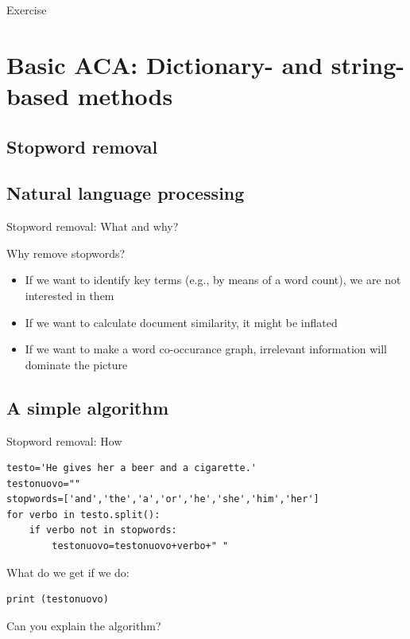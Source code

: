 \documentclass{beamer}
\begin{document}
	



\begin{frame}[plain]
Exercise
\end{frame}





\section[Basic ACA]{Basic ACA: Dictionary- and string-based methods}





\subsection[Stopword removal]{Stopword removal}

\subsection{Natural language processing}
\begin{frame}{Stopword removal: What and why?}
	\begin{block}{Why remove stopwords?}
		\begin{itemize}
			\item If we want to identify key terms (e.g., by means of a word count), we are not interested in them
			\item If we want to calculate document similarity, it might be inflated
			\item If we want to make a word co-occurance graph, irrelevant information will dominate the picture
		\end{itemize}
	\end{block}
\end{frame}

\subsection{A simple algorithm}

\begin{frame}[fragile]{Stopword removal: How}
\begin{lstlisting}
testo='He gives her a beer and a cigarette.'
testonuovo=""
stopwords=['and','the','a','or','he','she','him','her']
for verbo in testo.split():
    if verbo not in stopwords:
        testonuovo=testonuovo+verbo+" "
\end{lstlisting}
What do we get if we do:
\begin{lstlisting}
print (testonuovo)
\end{lstlisting}
Can you explain the algorithm?
\end{frame}
\end{document}
